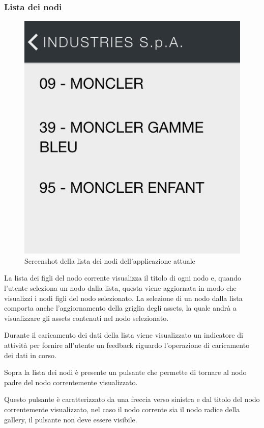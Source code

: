 \subsubsection{Lista dei nodi}

\begin{figure}[htbp]
\centering
\includegraphics[scale=0.3]{../immagini/warda-gallery-lista-nodi}
\caption{Screenshot della lista dei nodi dell'applicazione attuale}  
\end{figure}

La lista dei figli del nodo corrente visualizza il titolo di ogni nodo e, quando l'utente seleziona un nodo dalla lista, questa viene aggiornata in modo che visualizzi i nodi figli del nodo selezionato. 
La selezione di un nodo dalla lista comporta anche l'aggiornamento della griglia degli assets, la quale andrà a visualizzare gli assets contenuti nel nodo selezionato.

Durante il caricamento dei dati della lista viene visualizzato un indicatore di attività per fornire all'utente un feedback riguardo l'operazione di caricamento dei dati in corso.

Sopra la lista dei nodi è presente un pulsante che permette di tornare al nodo padre del nodo correntemente visualizzato.

Questo pulsante è caratterizzato da una freccia verso sinistra e dal titolo del nodo correntemente visualizzato, nel caso il nodo corrente sia il nodo radice della gallery, il pulsante non deve essere visibile.

